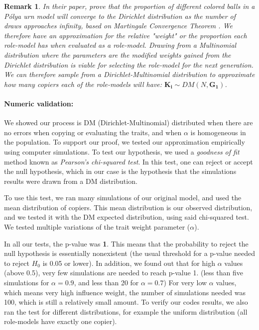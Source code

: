 \documentclass[12pt]{extarticle}
\let\vec\mathbf
\newtheorem{remark}{Remark}
\begin{document}
\begin{remark}
In their paper, \citet[section 2]{dirichlet} prove that the proportion of different colored balls in a \textit{Pólya urn model} will converge to the Dirichlet distribution as the number of draws approaches infinity, based on \textit{Martingale Convergence Theorem} \citep{martingaleBook}.
We therefore have an approximation for the relative "weight" or the proportion each role-model has when evaluated as a role-model. Drawing from a Multinomial distribution where the parameters are the modified weights gained from the Dirichlet distribution is viable for selecting the role-model for the next generation.
We can therefore sample from a Dirichlet-Multinomial distribution to approximate how many copiers each of the role-models will have:
$\vec{K_i} \sim DM(N,\vec{G_1})$.
\end{remark}

\paragraph{Numeric validation:} We showed our process is DM (Dirichlet-Multinomial) distributed when there are no errors when copying or evaluating the traits, and when $\alpha$ is homogeneous in the population. To support our proof, we tested our approximation empirically using computer simulations.
To test our hypothesis, we used a \textit{goodness of fit} method known as \textit{Pearson's chi-squared test}. In this test, one can reject or accept the null hypothesis, which in our case is the hypothesis that the simulations results were drawn from a DM distribution.

To use this test, we ran many simulations of our original model, and used the mean distribution of copiers. This mean distribution is our observed distribution, and we tested it with the DM expected distribution, using said chi-squared test.
We tested multiple variations of the trait weight parameter ($\alpha$).

In all our tests, the p-value was \textbf{1}. This means that the probability to reject the null hypothesis is essentially nonexistent (the usual threshold for a p-value needed to reject $H_0$ is 0.05 or lower). 
In addition, we found out that for high $\alpha$ values (above 0.5), very few simulations are needed to reach p-value 1. (less than five simulations for $\alpha=0.9$, and less than 20 for $\alpha=0.7$)
For very low $\alpha$ values, which means very high influence weight, the number of simulations needed was 100, which is still a relatively small amount.
To verify our codes results, we also ran the test for different distributions, for example the uniform distribution (all role-models have exactly one copier).
\end{document}

